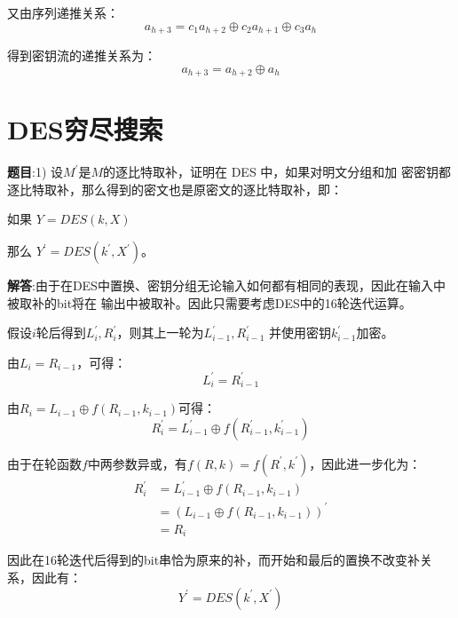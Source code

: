 又由序列递推关系：
\begin{equation}
    a_{h+3} = c_1 a_{h+2} \oplus c_2 a_{h+1} \oplus c_3 a_{h}
\end{equation}

得到密钥流的递推关系为：
\begin{equation}
    a_{h+3} = a_{h+2} \oplus a_{h}
\end{equation}

\section{DES穷尽搜索}

\textbf{题目}:1) 设$M^{\prime}$是$M$的逐比特取补，证明在 DES 中，如果对明文分组和加
密密钥都逐比特取补，那么得到的密文也是原密文的逐比特取补，即：

如果 $Y = DES(k, X)$

那么 $Y^{\prime} = DES(k^{\prime}, X^{\prime})$。

\textbf{解答}:由于在DES中置换、密钥分组无论输入如何都有相同的表现，因此在输入中被取补的bit将在
输出中被取补。因此只需要考虑DES中的16轮迭代运算。

假设$i$轮后得到$L_i^{\prime}, R_i^{\prime}$，则其上一轮为$L_{i-1}^{\prime}, R_{i-1}^{\prime}$
并使用密钥$k_{i-1}^{\prime}$加密。

由$L_i=R_{i-1}$，可得：
\begin{equation}
    L_i^{\prime} = R_{i-1}^{\prime}
\end{equation}

由$R_i = L_{i-1} \oplus f(R_{i-1}, k_{i-1})$可得：
\begin{equation}
    R_i^{\prime} = L_{i-1}^{\prime} \oplus f(R_{i-1}^{\prime}, k_{i-1}^{\prime})
\end{equation}

由于在轮函数$f$中两参数异或，有$f(R,k)=f(R^{\prime},k^{\prime})$，因此进一步化为：
\begin{equation}
    \begin{aligned}
        R_i^{\prime}    &= L_{i-1}^{\prime} \oplus f(R_{i-1}, k_{i-1})\\
                        &= (L_{i-1} \oplus f(R_{i-1}, k_{i-1}))^{\prime}\\
                        &= R_i
    \end{aligned}
\end{equation}

因此在16轮迭代后得到的bit串恰为原来的补，而开始和最后的置换不改变补关系，因此有：
\begin{equation}
    Y^{\prime} = DES(k^{\prime}, X^{\prime})
\end{equation}

